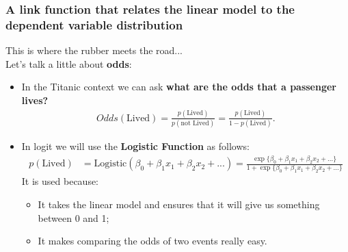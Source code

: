 \documentclass[aspectratio=169]{beamer}
\begin{document}
\begin{frame}
\frametitle{A link function that relates the linear model to the dependent variable distribution}

This is where the rubber meets the road...\\
\bigskip
Let's talk a little about \textbf{odds}:
\begin{itemize}
\item In the Titanic context we can ask \textbf{what are the odds that a passenger lives?}
\begin{align*}
Odds(\mbox{Lived}) = \frac{p(\mbox{Lived})}{p(\mbox{not Lived})} = \frac{p(\mbox{Lived})}{1 - p(\mbox{Lived})}.
\end{align*}
\item In logit we will use the \textbf{Logistic Function} as follows:
\begin{align*}
p(\mbox{Lived}) &= \mbox{Logistic}(\beta_0 + \beta_1x_1 + \beta_2x_2 + ...) = \frac{\exp\{\beta_0 + \beta_1x_1 + \beta_2x_2 + ...\}}{1 + \exp\{\beta_0 + \beta_1x_1 + \beta_2x_2 + ...\}}
\end{align*}
It is used because:
\begin{itemize}
\item It takes the linear model and ensures that it will give us something between 0 and 1;
\item It makes comparing the odds of two events really easy.
\end{itemize}

\end{itemize}

\end{frame}
\end{document}
